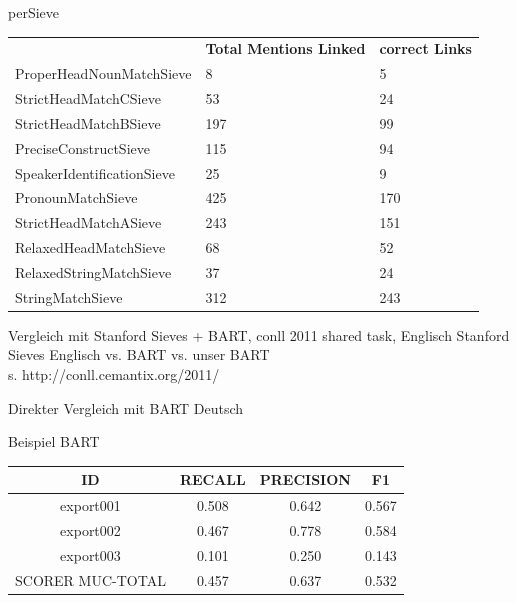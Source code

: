 \documentclass[11pt,a4paper]{beamer}
\begin{document}
\begin{frame}{perSieve}
\begin{table}[h]
\begin{tabular}{lll}
                           & \textbf{Total Mentions Linked} & \textbf{correct Links} \\
ProperHeadNounMatchSieve   & 8                              & 5                      \\
StrictHeadMatchCSieve      & 53                             & 24                     \\
StrictHeadMatchBSieve      & 197                            & 99                     \\
PreciseConstructSieve      & 115                            & 94                     \\
SpeakerIdentificationSieve & 25                             & 9                      \\
PronounMatchSieve          & 425                            & 170                    \\
StrictHeadMatchASieve      & 243                            & 151                    \\
RelaxedHeadMatchSieve      & 68                             & 52                     \\
RelaxedStringMatchSieve    & 37                             & 24                     \\
StringMatchSieve           & 312                            & 243                   
\end{tabular}
\end{table}
\end{frame}


\begin{frame}{Vergleich mit Stanford Sieves + BART, conll 2011 shared task, Englisch}
Stanford Sieves Englisch vs. BART vs. unser BART\\

s. http://conll.cemantix.org/2011/
\end{frame}

\begin{frame}{Direkter Vergleich mit BART Deutsch}

Beispiel BART

\begin{tabular}{|c|c|c|c|}
\hline 
ID & RECALL & PRECISION & F1 \\ 
\hline 
export001 & 0.508 & 0.642 & 0.567 \\ 
\hline 
export002 & 0.467 & 0.778   & 0.584 \\ 
\hline 
export003 & 0.101 & 0.250 & 0.143 \\ 
\hline 
SCORER MUC-TOTAL & 0.457 & 0.637   & 0.532 \\
\hline

\end{tabular} 
\end{frame}
\end{document}
